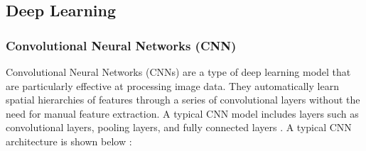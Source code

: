 





\subsection{Deep Learning}

\subsubsection{Convolutional Neural Networks (CNN)}

Convolutional Neural Networks (CNNs) are a type of deep learning model that are particularly effective at processing image data. They automatically learn spatial hierarchies of features through a series of convolutional layers without the need for manual feature extraction. A typical CNN model includes layers such as convolutional layers, pooling layers, and fully connected layers \cite{DL.4}. A typical CNN architecture is shown below
:\cite{4.30 1}



